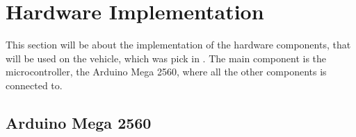 \section{Hardware Implementation}
This section will be about the implementation of the hardware components, that will be used on the vehicle, which was pick in . The main component is the microcontroller, the Arduino Mega 2560, where all the other components is connected to. 

\subsection{Arduino Mega 2560}










